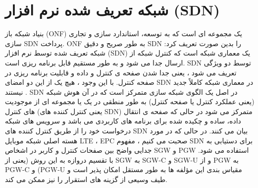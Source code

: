 \section{شبکه تعریف شده نرم افزار (SDN)}
بنیاد شبکه باز 
(ONF) 
یک مجموعه ای است که به توسعه، استاندارد سازی و تجاری سازی SDN 
پرداخت.
ONF
 به طور صریح و دقیق SDN را بدین صورت تعریف کرد:
 شبکه تعریف شده توسط نرم افزار (SDN) یک معماری شبکه است که کنترل شبکه از ارسال جدا می شود و به طور مستقیم قابل برنامه ریزی است.
 SDN توسط دو ویژگی تعریف می شود ، یعنی جدا شدن صفحه ی کنترل و داده و قابلیت برنامه ریزی در صفحه کنترل.
 با این وجود ، هیچ یک از این دو امضای SDN در معماری شبکه کاملاً جدید نیستند
 \cite{SDN1}.
 SDN 
 در اصل یک الگوی شبکه سازی متمرکز است که در آن هوش شبکه (یعنی عملکرد کنترل یا صفحه کنترل) به طور منطقی در یک یا مجموعه ای از موجودیت های کنترل (یعنی کنترل کننده های SDN) متمرکز می شود در حالی که صفحه ی انتقال داده،  ساده و چکیده شده برای برنامه های کاربردی می باشد و سرویس های شبکه درخواست خود را از طریق کنترل کننده های SDN
 بیان می کنند.
 در حالی که در مورد هسته اصلی شبکه موبایل LTE ، EPC صحبت می کنیم ، مفهوم SDN برای دستیابی به جدایی واضح بین صفحات کنترل و کاربر در اشخاص SGW و PGW استفاده می شود.
 با تقسیم دروازه به این روش (یعنی از SGW به SGW-C و
SGW-U 
و از PGW به PGW-C و (PGW-U 
  مقیاس بندی این مؤلفه ها به طور مستقل امکان پذیر است و طیف وسیعی از گزینه های استقرار را نیز ممکن می کند.
  
